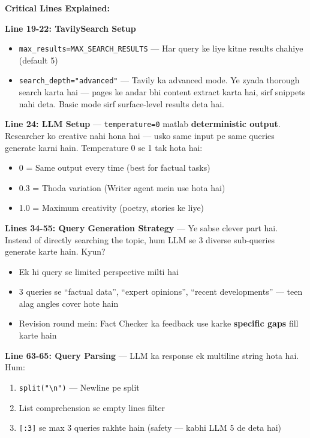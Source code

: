 \documentclass[12pt, a4paper]{article}
\begin{document}
\begin{codestorybox}
\textbf{Critical Lines Explained:}

\textbf{Line 19-22: TavilySearch Setup}
\begin{itemize}[leftmargin=*]
\item \texttt{max\_results=MAX\_SEARCH\_RESULTS} --- Har query ke liye kitne results chahiye (default 5)
\item \texttt{search\_depth="advanced"} --- Tavily ka advanced mode. Ye zyada thorough search karta hai --- pages ke andar bhi content extract karta hai, sirf snippets nahi deta. Basic mode sirf surface-level results deta hai.
\end{itemize}

\textbf{Line 24: LLM Setup} --- \texttt{temperature=0} matlab \textbf{deterministic output}. Researcher ko creative nahi hona hai --- usko same input pe same queries generate karni hain. Temperature 0 se 1 tak hota hai:
\begin{itemize}
\item 0 = Same output every time (best for factual tasks)
\item 0.3 = Thoda variation (Writer agent mein use hota hai)
\item 1.0 = Maximum creativity (poetry, stories ke liye)
\end{itemize}

\textbf{Lines 34-55: Query Generation Strategy} --- Ye sabse clever part hai. Instead of directly searching the topic, hum LLM se 3 diverse sub-queries generate karte hain. Kyun?
\begin{itemize}
\item Ek hi query se limited perspective milti hai
\item 3 queries se ``factual data'', ``expert opinions'', ``recent developments'' --- teen alag angles cover hote hain
\item Revision round mein: Fact Checker ka feedback use karke \textbf{specific gaps} fill karte hain
\end{itemize}

\textbf{Line 63-65: Query Parsing} --- LLM ka response ek multiline string hota hai. Hum:
\begin{enumerate}
\item \texttt{split("\textbackslash n")} --- Newline pe split
\item List comprehension se empty lines filter
\item \texttt{[:3]} se max 3 queries rakhte hain (safety --- kabhi LLM 5 de deta hai)
\end{enumerate}


\end{codestorybox}
\end{document}
